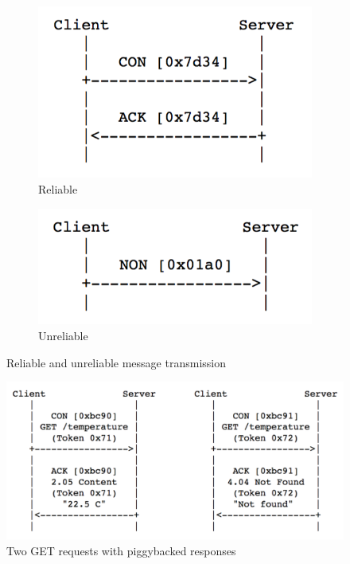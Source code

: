 \begin{figure}[!htbp]
\begin{subfigure}[t]{.5\textwidth}
  \centering
  \includegraphics[scale = 0.55]{reliable_msg_trans.png}
  \caption{Reliable}
  \label{fig:reliable_msg_trans}
\end{subfigure}%
\begin{subfigure}[t]{.5\textwidth}
  \centering
  \includegraphics[scale = 0.55]{unreliable_msg_trans.png}
  \caption{Unreliable}
  \label{fig:unreliable_msg_trans}
\end{subfigure}
\caption{Reliable and unreliable message transmission}
\label{fig:fig}
\end{figure}

\begin{figure}[!htbp]
\centering
\includegraphics[scale = 0.55]{get_example.png}
\caption{Two GET requests with piggybacked responses}
\label{fig:get_example}
\end{figure}

